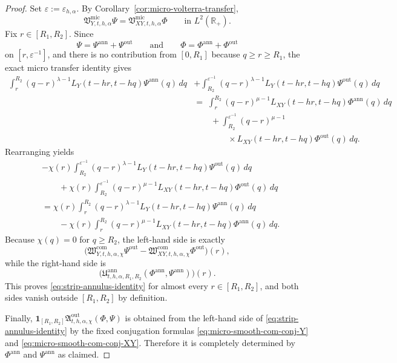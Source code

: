 \documentclass[11pt,a4paper]{amsart}
\theoremstyle{plain}
\theoremstyle{definition}
\theoremstyle{remark}
\newcommand{\R}{\mathbb{R}}
\newcommand{\one}{\mathbf 1}
\begin{document}
\begin{proof}
Set \(\varepsilon:=\varepsilon_{h,\alpha}\). By Corollary~\ref{cor:micro-volterra-transfer},
\[
\mathfrak V_{Y,t,h,\alpha}^{\mathrm{mic}}\Psi
=
\mathfrak V_{XY,t,h,\alpha}^{\mathrm{mic}}\Phi
\qquad\text{in }L^2(\R_+).
\]
Fix \(r\in[R_1,R_2]\). Since
\[
\Psi=\Psi^{\mathrm{ann}}+\Psi^{\mathrm{out}}
\qquad\text{and}\qquad
\Phi=\Phi^{\mathrm{ann}}+\Phi^{\mathrm{out}}
\]
on \([r,\varepsilon^{-1}]\), and there is no contribution from \([0,R_1]\) because \(q\ge r\ge R_1\),
the exact micro transfer identity gives
\begin{align*}
\int_r^{R_2}
(q-r)^{\lambda-1}
L_Y(t-hr,t-hq)\Psi^{\mathrm{ann}}(q)\,dq
&+
\int_{R_2}^{\varepsilon^{-1}}
(q-r)^{\lambda-1}
L_Y(t-hr,t-hq)\Psi^{\mathrm{out}}(q)\,dq\\
&=\;
\int_r^{R_2}
(q-r)^{\mu-1}
L_{XY}(t-hr,t-hq)\Phi^{\mathrm{ann}}(q)\,dq
\\
&\qquad
+\int_{R_2}^{\varepsilon^{-1}}
(q-r)^{\mu-1}
\\
&\qquad\qquad \times
L_{XY}(t-hr,t-hq)\Phi^{\mathrm{out}}(q)\,dq.
\end{align*}
Rearranging yields
\begin{align*}
&-\chi(r)
\int_{R_2}^{\varepsilon^{-1}}
(q-r)^{\lambda-1}
L_Y(t-hr,t-hq)\Psi^{\mathrm{out}}(q)\,dq\\
&\qquad+
\chi(r)
\int_{R_2}^{\varepsilon^{-1}}
(q-r)^{\mu-1}
L_{XY}(t-hr,t-hq)\Phi^{\mathrm{out}}(q)\,dq\\
&=
\chi(r)
\int_r^{R_2}
(q-r)^{\lambda-1}
L_Y(t-hr,t-hq)\Psi^{\mathrm{ann}}(q)\,dq\\
&\qquad-
\chi(r)
\int_r^{R_2}
(q-r)^{\mu-1}
L_{XY}(t-hr,t-hq)\Phi^{\mathrm{ann}}(q)\,dq.
\end{align*}
Because \(\chi(q)=0\) for \(q\ge R_2\), the left-hand side is exactly
\[
\bigl(
\mathfrak W_{Y,t,h,\alpha,\chi}^{\mathrm{com}}\Psi^{\mathrm{out}}
-
\mathfrak W_{XY,t,h,\alpha,\chi}^{\mathrm{com}}\Phi^{\mathrm{out}}
\bigr)(r),
\]
while the right-hand side is
\[
\bigl(
\mathfrak U_{t,h,\alpha,R_1,R_2}^{\mathrm{ann}}
(\Phi^{\mathrm{ann}},\Psi^{\mathrm{ann}})
\bigr)(r).
\]
This proves \eqref{eq:strip-annulus-identity} for almost every \(r\in[R_1,R_2]\), and both sides
vanish outside \([R_1,R_2]\) by definition.

Finally, \(\one_{[R_1,R_2]}\mathfrak A_{t,h,\alpha,\chi}^{\mathrm{out}}(\Phi,\Psi)\) is obtained
from the left-hand side of \eqref{eq:strip-annulus-identity} by the fixed conjugation formulas
\eqref{eq:micro-smooth-com-conj-Y} and \eqref{eq:micro-smooth-com-conj-XY}. Therefore it is
completely determined by \(\Phi^{\mathrm{ann}}\) and \(\Psi^{\mathrm{ann}}\) as claimed.
\end{proof}
\end{document}
